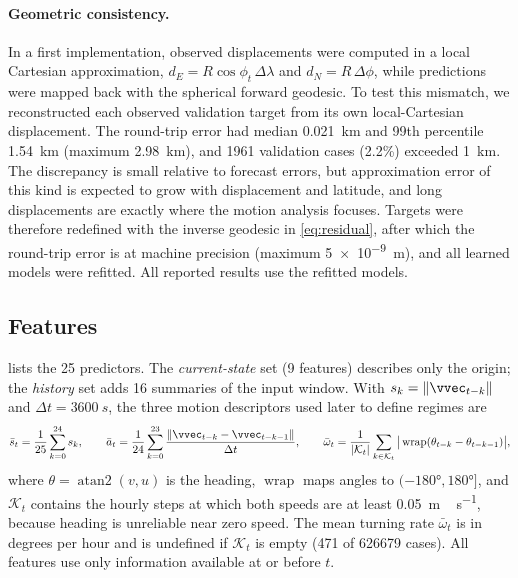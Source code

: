 \paragraph{Geometric consistency.} In a first implementation, observed displacements were computed in a local Cartesian approximation, $d_E=R\cos\phi_t\,\Delta\lambda$ and $d_N=R\,\Delta\phi$, while predictions were mapped back with the spherical forward geodesic. To test this mismatch, we reconstructed each observed validation target from its own local-Cartesian displacement. The round-trip error had median \SI{0.021}{km} and 99th percentile \SI{1.54}{km} (maximum \SI{2.98}{km}), and \num{1961} validation cases (2.2\%) exceeded \SI{1}{km}. The discrepancy is small relative to forecast errors, but approximation error of this kind is expected to grow with displacement and latitude, and long displacements are exactly where the motion analysis focuses. Targets were therefore redefined with the inverse geodesic in \eqref{eq:residual}, after which the round-trip error is at machine precision (maximum \SI{5e-9}{m}), and all learned models were refitted. All reported results use the refitted models.

\subsection{Features}
 lists the 25 predictors. The \emph{current-state} set (9 features) describes only the origin; the \emph{history} set adds 16 summaries of the input window. With $s_k=\lVert\vvec_{t-k}\rVert$ and $\Delta t=\SI{3600}{s}$, the three motion descriptors used later to define regimes are
\begin{equation}\label{eq:descriptors}
\bar s_t=\frac{1}{25}\sum_{k=0}^{24}s_k,\qquad
\bar a_t=\frac{1}{24}\sum_{k=0}^{23}\frac{\lVert\vvec_{t-k}-\vvec_{t-k-1}\rVert}{\Delta t},\qquad
\bar\omega_t=\frac{1}{|\mathcal{K}_t|}\sum_{k\in\mathcal{K}_t}\big|\operatorname{wrap}(\theta_{t-k}-\theta_{t-k-1})\big|,
\end{equation}
where $\theta=\operatorname{atan2}(v,u)$ is the heading, $\operatorname{wrap}$ maps angles to $(-\ang{180},\ang{180}]$, and $\mathcal{K}_t$ contains the hourly steps at which both speeds are at least \SI{0.05}{m\,s^{-1}}, because heading is unreliable near zero speed. The mean turning rate $\bar\omega_t$ is in degrees per hour and is undefined if $\mathcal{K}_t$ is empty (471 of \num{626679} cases). All features use only information available at or before $t$.

